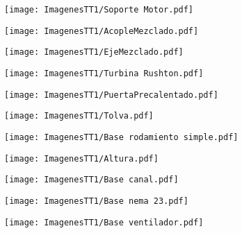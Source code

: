 \documentclass[14pt,oneside]{extarticle} %
\begin{document}
\begin{figure}
    \centering
    \texttt{[image: ImagenesTT1/Soporte Motor.pdf]}
\end{figure}

\begin{figure}
    \centering
    \texttt{[image: ImagenesTT1/AcopleMezclado.pdf]}
\end{figure}

\begin{figure}
    \centering
    \texttt{[image: ImagenesTT1/EjeMezclado.pdf]}
\end{figure}

\begin{figure}
    \centering
    \texttt{[image: ImagenesTT1/Turbina Rushton.pdf]}
\end{figure}

\begin{figure}
    \centering
    \texttt{[image: ImagenesTT1/PuertaPrecalentado.pdf]}
\end{figure}

\begin{figure}
    \centering
    \texttt{[image: ImagenesTT1/Tolva.pdf]}
\end{figure}

\begin{figure}
    \centering
    \texttt{[image: ImagenesTT1/Base rodamiento simple.pdf]}
\end{figure}

\begin{figure}
    \centering
    \texttt{[image: ImagenesTT1/Altura.pdf]}
\end{figure}

\begin{figure}
    \centering
    \texttt{[image: ImagenesTT1/Base canal.pdf]}
\end{figure}

\begin{figure}
    \centering
    \texttt{[image: ImagenesTT1/Base nema 23.pdf]}
\end{figure}

\begin{figure}
    \centering
    \texttt{[image: ImagenesTT1/Base ventilador.pdf]}
\end{figure}
\end{document}
